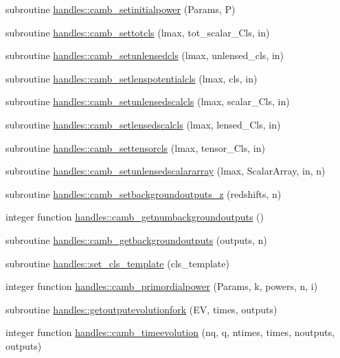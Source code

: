 \begin{DoxyCompactItemize}
\item 
subroutine \mbox{\hyperlink{namespacehandles_a8cc3e1b0936fd89aca15f4cead25ad9c}{handles\+::camb\+\_\+setinitialpower}} (Params, P)
\item 
subroutine \mbox{\hyperlink{namespacehandles_aa9ec681801ce104b28add54fd9ee3d16}{handles\+::camb\+\_\+settotcls}} (lmax, tot\+\_\+scalar\+\_\+\+Cls, in)
\item 
subroutine \mbox{\hyperlink{namespacehandles_a275c2c9c895b79f63eef42b7fe81c842}{handles\+::camb\+\_\+setunlensedcls}} (lmax, unlensed\+\_\+cls, in)
\item 
subroutine \mbox{\hyperlink{namespacehandles_ae3fb31c2363d57d05718b6cb9bc6bf5d}{handles\+::camb\+\_\+setlenspotentialcls}} (lmax, cls, in)
\item 
subroutine \mbox{\hyperlink{namespacehandles_a8a98a8d5a48c920afe02832367244648}{handles\+::camb\+\_\+setunlensedscalcls}} (lmax, scalar\+\_\+\+Cls, in)
\item 
subroutine \mbox{\hyperlink{namespacehandles_a670ac8cb259c4983bc0cb16b053252b7}{handles\+::camb\+\_\+setlensedscalcls}} (lmax, lensed\+\_\+\+Cls, in)
\item 
subroutine \mbox{\hyperlink{namespacehandles_a85a90c13c4ff2c1dc02dd5b6c6c8da9d}{handles\+::camb\+\_\+settensorcls}} (lmax, tensor\+\_\+\+Cls, in)
\item 
subroutine \mbox{\hyperlink{namespacehandles_ad9c5c14a68ab016e4b976c1f3f665779}{handles\+::camb\+\_\+setunlensedscalararray}} (lmax, Scalar\+Array, in, n)
\item 
subroutine \mbox{\hyperlink{namespacehandles_a4f9beee6e16e46b574ad807258bca56c}{handles\+::camb\+\_\+setbackgroundoutputs\+\_\+z}} (redshifts, n)
\item 
integer function \mbox{\hyperlink{namespacehandles_a67c4066d5a6fa655910d3dc0fc295419}{handles\+::camb\+\_\+getnumbackgroundoutputs}} ()
\item 
subroutine \mbox{\hyperlink{namespacehandles_a8c6d226c983d217554ce7208a52f6684}{handles\+::camb\+\_\+getbackgroundoutputs}} (outputs, n)
\item 
subroutine \mbox{\hyperlink{namespacehandles_a9622707d668c5bb52a241302010db94f}{handles\+::set\+\_\+cls\+\_\+template}} (cls\+\_\+template)
\item 
integer function \mbox{\hyperlink{namespacehandles_a694425016cc091db331b30804819bca8}{handles\+::camb\+\_\+primordialpower}} (Params, k, powers, n, i)
\item 
subroutine \mbox{\hyperlink{namespacehandles_abde0c82099eadde40e5f09d895ec6ebb}{handles\+::getoutputevolutionfork}} (EV, times, outputs)
\item 
integer function \mbox{\hyperlink{namespacehandles_a0d801cc8883d8e64021e9a4703f5ac63}{handles\+::camb\+\_\+timeevolution}} (nq, q, ntimes, times, noutputs, outputs)
\end{DoxyCompactItemize}
